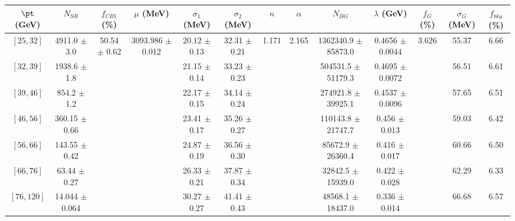 \begin{tabular}{c||c|c|c|c|c|c|c|c|c|c|c||c}
$\pt$ (GeV) & $N_{SR}$ & $f_{CB1}$ (\%) & $\mu$ (MeV) & $\sigma_1$ (MeV) & $\sigma_2$ (MeV) & $n$ & $\alpha$ & $N_{BG}$ & $\lambda$ (GeV) & $f_G$ (\%) & $\sigma_G$ (MeV) & $f_{bkg}$ (\%) \\
\hline
$[25, 32]$ & 4911.0 $\pm$ 3.0 & \multirow{7}{*}{50.54 $\pm$ 0.62} & \multirow{7}{*}{3093.986 $\pm$ 0.012} & 20.12 $\pm$ 0.13 & 32.31 $\pm$ 0.21 & \multirow{7}{*}{1.171} & \multirow{7}{*}{2.165} & 1362340.9 $\pm$ 85873.0 & 0.4656 $\pm$ 0.0044 & \multirow{7}{*}{3.626} & 55.37 & 6.66\\
$[32, 39]$ & 1938.6 $\pm$ 1.8 &  &  & 21.15 $\pm$ 0.14 & 33.23 $\pm$ 0.23 &  &  & 504531.5 $\pm$ 51179.3 & 0.4695 $\pm$ 0.0072 &  & 56.51 & 6.61\\
$[39, 46]$ & 854.2 $\pm$ 1.2 &  &  & 22.17 $\pm$ 0.15 & 34.14 $\pm$ 0.24 &  &  & 274921.8 $\pm$ 39925.1 & 0.4537 $\pm$ 0.0096 &  & 57.65 & 6.51\\
$[46, 56]$ & 360.15 $\pm$ 0.66 &  &  & 23.41 $\pm$ 0.17 & 35.26 $\pm$ 0.27 &  &  & 110143.8 $\pm$ 21747.7 & 0.456 $\pm$ 0.013 &  & 59.03 & 6.42\\
$[56, 66]$ & 143.55 $\pm$ 0.42 &  &  & 24.87 $\pm$ 0.19 & 36.56 $\pm$ 0.30 &  &  & 85672.9 $\pm$ 26360.4 & 0.416 $\pm$ 0.017 &  & 60.66 & 6.50\\
$[66, 76]$ & 63.44 $\pm$ 0.27 &  &  & 26.33 $\pm$ 0.21 & 37.87 $\pm$ 0.34 &  &  & 32842.5 $\pm$ 15939.0 & 0.422 $\pm$ 0.028 &  & 62.29 & 6.33\\
$[76, 120]$ & 14.044 $\pm$ 0.064 &  &  & 30.27 $\pm$ 0.27 & 41.41 $\pm$ 0.43 &  &  & 48568.1 $\pm$ 18437.0 & 0.336 $\pm$ 0.014 &  & 66.68 & 6.57\\
\end{tabular}
